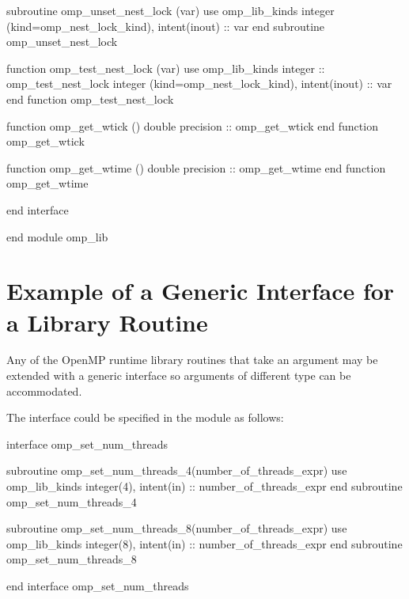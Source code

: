 {\begin{codepar}
          subroutine omp\_unset\_nest\_lock (var)
           use omp\_lib\_kinds
           integer (kind=omp\_nest\_lock\_kind), intent(inout) :: var
          end subroutine omp\_unset\_nest\_lock

          function omp\_test\_nest\_lock (var)
           use omp\_lib\_kinds
           integer :: omp\_test\_nest\_lock
           integer (kind=omp\_nest\_lock\_kind), intent(inout) :: var
          end function omp\_test\_nest\_lock

          function omp\_get\_wtick ()
           double precision :: omp\_get\_wtick
          end function omp\_get\_wtick

          function omp\_get\_wtime ()
           double precision :: omp\_get\_wtime
          end function omp\_get\_wtime

          end interface

        end module omp\_lib
\end{codepar}} %






\pagebreak
\section{Example of a Generic Interface for a Library Routine}
\label{sec:Example of a Generic Interface for a Library Routine}
Any of the OpenMP runtime library routines that take an argument may be extended 
with a generic interface so arguments of different  type can be accommodated.

The  interface could be specified in the  module 
as follows:

\begin{boxedcode}
interface omp\_set\_num\_threads

    subroutine omp\_set\_num\_threads_4(number\_of\_threads\_expr)
      use omp\_lib\_kinds
      integer(4), intent(in) :: number\_of\_threads\_expr
    end subroutine omp\_set\_num\_threads_4

    subroutine omp\_set\_num\_threads_8(number\_of\_threads\_expr)
      use omp\_lib\_kinds
      integer(8), intent(in) :: number\_of\_threads\_expr
    end subroutine omp\_set\_num\_threads_8

end interface omp\_set\_num\_threads
\end{boxedcode}



